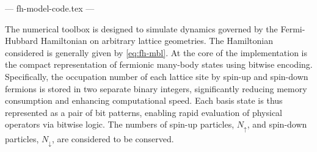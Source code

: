 --- fh-model-code.tex ---




















The numerical toolbox is designed to simulate dynamics governed by the Fermi-Hubbard Hamiltonian on arbitrary lattice geometries. The Hamiltonian considered is generally given by \eqref{eq:fh-mbl}. At the core of the implementation is the compact representation of fermionic many-body states using bitwise encoding. Specifically, the occupation number of each lattice site by spin-up and spin-down fermions is stored in two separate binary integers, significantly reducing memory consumption and enhancing computational speed. Each basis state is thus represented as a pair of bit patterns, enabling rapid evaluation of physical operators via bitwise logic. The numbers of spin-up particles, $N_\uparrow$, and spin-down particles, $N_\downarrow$, are considered to be conserved.


